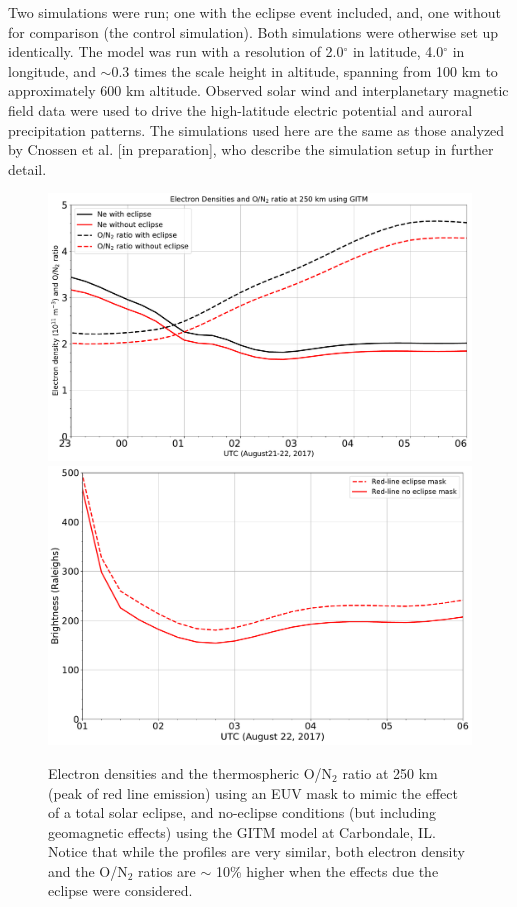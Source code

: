 \documentclass[crop=false,class=mitthesis,oneside,font=12pt]{standalone}
\begin{document}
%
Two simulations were run; one with the eclipse event included, and, one without for comparison (the control simulation). Both simulations were otherwise set up identically. The model was run with a resolution of 2.0$^\circ$ in latitude, 4.0$^\circ$ in longitude, and $\sim$0.3 times the scale height in altitude, spanning from 100 km to approximately 600 km altitude. Observed solar wind and interplanetary magnetic field data were used to drive the high-latitude electric potential and auroral precipitation patterns. The simulations used here are the same as those analyzed by Cnossen et al. [in preparation], who describe the simulation setup in further detail. 
   \begin{figure}[H]
 \centering\includegraphics[width=35pc]{ec_vs_nec_tid.pdf}
 \centering\includegraphics[width=30pc]{GITM_with_GLOW_dglow.pdf}
 \caption{ Electron densities  and the thermospheric O/N$_2$ ratio at 250 km (peak of red line emission) using an EUV mask to mimic the effect of a total solar eclipse, and no-eclipse conditions (but including geomagnetic effects) using the GITM model at Carbondale, IL. Notice that while the profiles are very similar, both electron density and the O/N$_2$ ratios are $\sim$ 10\% higher when the effects due the eclipse were considered. }
 \label{fig:ec_ne}
 \end{figure}
 
\end{document}
